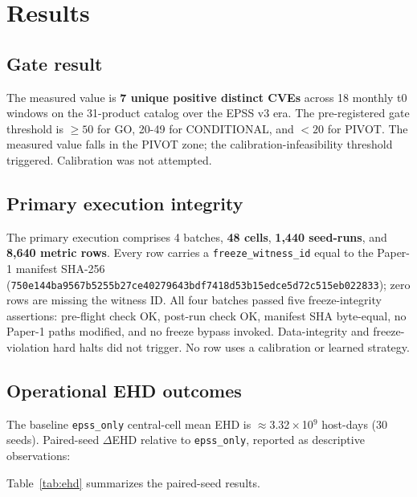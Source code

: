 \section{Results}
\subsection{Gate result}

The measured value is \textbf{7 unique positive distinct CVEs} across 18 monthly t0 windows on the 31-product catalog over the EPSS v3 era. The pre-registered gate threshold is $\geq 50$ for GO, 20-49 for CONDITIONAL, and $< 20$ for PIVOT. The measured value falls in the PIVOT zone; the calibration-infeasibility threshold triggered. Calibration was not attempted.

\subsection{Primary execution integrity}

The primary execution comprises 4 batches, \textbf{48 cells}, \textbf{1,440 seed-runs}, and \textbf{8,640 metric rows}. Every row carries a \texttt{freeze\_witness\_id} equal to the Paper-1 manifest SHA-256 (\texttt{750e144ba9567b52\allowbreak 55b27ce40279643b\allowbreak df7418d53b15edce\allowbreak 5d72c515eb022833}); zero rows are missing the witness ID. All four batches passed five freeze-integrity assertions: pre-flight check OK, post-run check OK, manifest SHA byte-equal, no Paper-1 paths modified, and no freeze bypass invoked. Data-integrity and freeze-violation hard halts did not trigger. No row uses a calibration or learned strategy.

\subsection{Operational EHD outcomes}

The baseline \texttt{epss\_only} central-cell mean EHD is $\approx$3.32\,$\times$\,10$^9$ host-days (30 seeds). Paired-seed $\Delta$EHD relative to \texttt{epss\_only}, reported as descriptive observations:

Table~\ref{tab:ehd} summarizes the paired-seed results.

